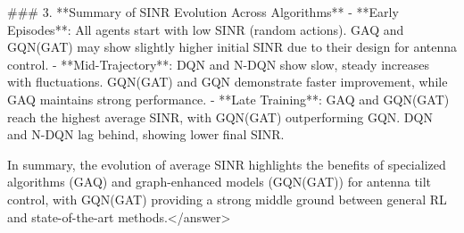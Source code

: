 ### 3. **Summary of SINR Evolution Across Algorithms**  
- **Early Episodes**: All agents start with low SINR (random actions). GAQ and GQN(GAT) may show slightly higher initial SINR due to their design for antenna control.  
- **Mid-Trajectory**: DQN and N-DQN show slow, steady increases with fluctuations. GQN(GAT) and GQN demonstrate faster improvement, while GAQ maintains strong performance.  
- **Late Training**: GAQ and GQN(GAT) reach the highest average SINR, with GQN(GAT) outperforming GQN. DQN and N-DQN lag behind, showing lower final SINR.  

In summary, the evolution of average SINR highlights the benefits of specialized algorithms (GAQ) and graph-enhanced models (GQN(GAT)) for antenna tilt control, with GQN(GAT) providing a strong middle ground between general RL and state-of-the-art methods.</answer>